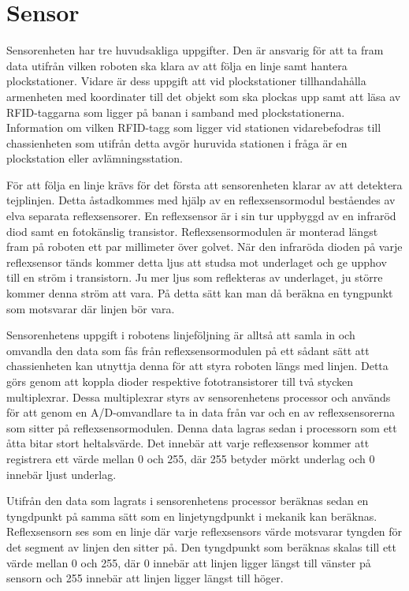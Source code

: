 

\section{Sensor}

Sensorenheten har tre huvudsakliga uppgifter. Den är ansvarig för att ta fram data utifrån vilken roboten ska klara av att följa en linje samt hantera plockstationer. Vidare är dess uppgift att vid plockstationer tillhandahålla armenheten med koordinater till det objekt som ska plockas upp samt att läsa av RFID-taggarna som ligger på banan i samband med plockstationerna. Information om vilken RFID-tagg som ligger vid stationen vidarebefodras till chassienheten som utifrån detta avgör huruvida stationen i fråga är en plockstation eller avlämningsstation.

För att följa en linje krävs för det första att sensorenheten klarar av att detektera tejplinjen. Detta åstadkommes med hjälp av en reflexsensormodul beståendes av elva separata reflexsensorer. En reflexsensor är i sin tur uppbyggd av en infraröd diod samt en fotokänslig transistor. Reflexsensormodulen är monterad längst fram på roboten ett par millimeter över golvet. När den infraröda dioden på varje reflexsensor tänds kommer detta ljus att studsa mot underlaget och ge upphov till en ström i transistorn. Ju mer ljus som reflekteras av underlaget, ju större kommer denna ström att vara. På detta sätt kan man då beräkna en tyngpunkt som motsvarar där linjen bör vara.

Sensorenhetens uppgift i robotens linjeföljning är alltså att samla in och omvandla den data som fås från reflexsensormodulen på ett sådant sätt att chassienheten kan utnyttja denna för att styra roboten längs med linjen. Detta görs genom att koppla dioder respektive fototransistorer till två stycken multiplexrar. Dessa multiplexrar styrs av sensorenhetens processor och används för att genom en A/D-omvandlare ta in data från var och en av reflexsensorerna som sitter på reflexsensormodulen. Denna data lagras sedan i processorn som ett åtta bitar stort heltalsvärde. Det innebär att varje reflexsensor kommer att registrera ett värde mellan 0 och 255, där 255 betyder mörkt underlag och 0 innebär ljust underlag.

Utifrån den data som lagrats i sensorenhetens processor beräknas sedan en tyngdpunkt på samma sätt som en linjetyngdpunkt i mekanik kan beräknas. Reflexsensorn ses som en linje där varje reflexsensors värde motsvarar tyngden för det segment av linjen den sitter på. Den tyngdpunkt som beräknas skalas till ett värde mellan 0 och 255, där 0 innebär att linjen ligger längst till vänster på sensorn och 255 innebär att linjen ligger längst till höger. 

